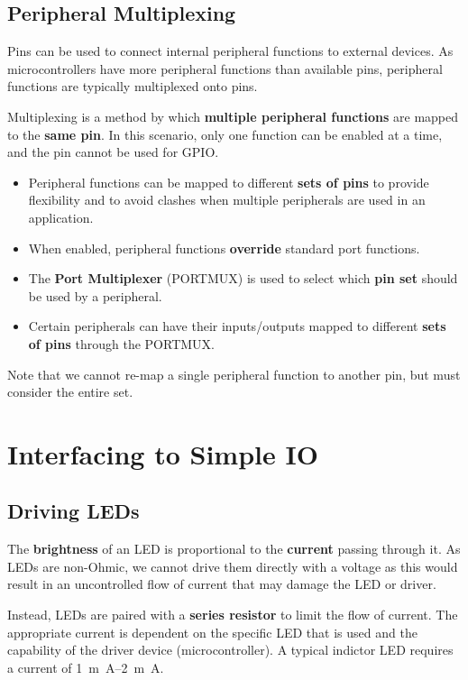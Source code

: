 \documentclass[a4paper]{report}
\begin{document}
\subsection{Peripheral Multiplexing}
Pins can be used to connect internal peripheral functions
to external devices.
As microcontrollers have more peripheral functions than available pins,
peripheral functions are typically multiplexed onto pins.
\begin{definition}[Multiplexing]
    Multiplexing is a method by which \textbf{multiple peripheral functions}
    are mapped to the \textbf{same pin}.
    In this scenario, only one function can be enabled at a time, and the pin
    cannot be used for GPIO\@.
\end{definition}
\begin{itemize}
    \item Peripheral functions can be mapped to different \textbf{sets of pins} to provide
          flexibility and to avoid clashes when multiple peripherals are used in
          an application.
    \item When enabled, peripheral functions \textbf{override} standard port functions.
    \item The \textbf{Port Multiplexer} (PORTMUX) is used to select which
          \textbf{pin set} should be used by a peripheral.
    \item Certain peripherals can have their inputs/outputs mapped to different
          \textbf{sets of pins} through the PORTMUX\@.
\end{itemize}
Note that we cannot re-map a single peripheral function to another pin, but must consider the entire set.
\section{Interfacing to Simple IO}
\subsection{Driving LEDs}
The \textbf{brightness} of an LED is proportional to the \textbf{current}
passing through it. As LEDs are non-Ohmic, we cannot drive them directly
with a voltage as this would result in an uncontrolled flow of current that
may damage the LED or driver.

Instead, LEDs are paired with a \textbf{series resistor} to limit the flow of current.
The appropriate current is dependent on the specific LED that is used
and the capability of the driver device (microcontroller).
A typical indictor LED requires a current of \qtyrange{1}{2}{m.A}.
\end{document}
